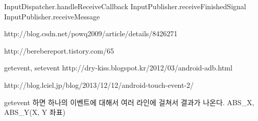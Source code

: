 InputDispatcher.handleReceiveCallback
	InputPublisher.receiveFinishedSignal
		InputPublisher.receiveMessage


http://blog.csdn.net/powq2009/article/details/8426271

http://berebereport.tistory.com/65

getevent, setevent
http://dry-kiss.blogspot.kr/2012/03/android-adb.html

http://blog.lciel.jp/blog/2013/12/12/android-touch-event-2/

getevent 하면 하나의 이벤트에 대해서 여러 라인에 걸쳐서 결과가 나온다. ABS_X, ABS_Y(X, Y 좌표)